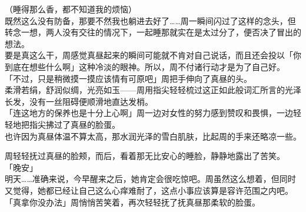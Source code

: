 （睡得那么香，都不知道我的烦恼）\\

既然这么没有防备，那要不然我也躺进去好了……周一瞬间闪过了这样的念头，但转念一想，两人没有交往的情况下，一起睡那就实在是太过分了，便否决了冒出的想法。\\

要是真这么干，周感觉真昼起来的瞬间可能就不肯对自己说话，而且还会投以「你到底在想些什么啊」这种冷淡的眼神。所以，周不付诸行动才是为了自己好。\\

「不过，只是稍微摸一摸应该情有可原吧」周把手伸向了真昼的头。\\

柔滑若绢，舒润似绸，光亮如玉——周用指尖轻轻梳过这正如此般词汇所言的光泽长发，没有一丝阻碍便顺滑地直达发梢。\\

「连这地方的保养也是十分上心啊」周一边对女性的努力感到赞叹和畏惧，一边轻轻地把指尖拂过了真昼的脸蛋。\\

也许因为真昼体温不算太高，那水润光泽的雪白肌肤，比起周的手来还略凉一些。

周轻轻抚过真昼的脸颊，而后，看着那无比安心的睡脸，静静地露出了苦笑。\\

「晚安」\\

明天……准确来说，今早醒来之后，她肯定会很吃惊吧。周虽然这么想着，但同时又觉得，她都已经让自己这么心痒难耐了，这点小事应该算是容许范围之内吧。\\

「真拿你没办法」周悄悄苦笑着，再次轻轻抚了抚真昼那柔软的脸蛋。
